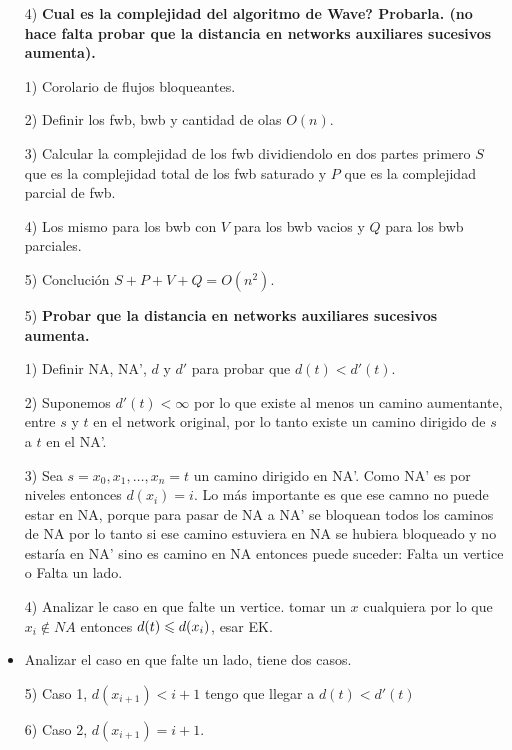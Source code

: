 \documentclass[12pt,a4paper]{article}
\begin{document}
\begin{itemize}
    \item [4)] \textbf{Cual es la complejidad del algoritmo de Wave? Probarla. (no hace falta 
    probar que la distancia en networks auxiliares sucesivos aumenta).}
    \label{dem:Wave}
\end{itemize}
\begin{itemize}
    \item [1)] Corolario de flujos bloqueantes.
    \item [2)] Definir los fwb, bwb y cantidad de olas $O(n)$.
    \item [3)] Calcular la complejidad de los fwb dividiendolo en dos partes
        primero $S$ que es la complejidad total de los fwb saturado y $P$ que 
        es la complejidad parcial de fwb.
    \item [4)] Los mismo para los bwb con $V$ para los bwb vacios y $Q$ para 
        los bwb parciales.
    \item [5)] Conclución $S + P + V + Q = O(n^{2})$.
\end{itemize}

\begin{itemize}
    \item [5)] \textbf{Probar que la distancia en networks auxiliares sucesivos aumenta.}
    \label{dem:dist2}
\end{itemize}
\begin{itemize}
    \item [1)] Definir NA, NA', $d$ y $d'$ para probar que $d(t) < d'(t)$.
    \item [2)] Suponemos $d'(t) < \infty$ por lo que existe al menos un camino 
        aumentante, entre $s$ y $t$ en el network original, por lo tanto existe 
        un camino dirigido de $s$ a $t$ en el NA'.
    \item [3)] Sea $s=x_{0},x_{1},\ldots ,x_{n} =t$ un camino dirigido en NA'. Como
        NA' es por niveles entonces $d(x_{i}) = i$. Lo más importante es que ese 
        camno no puede estar en NA, porque para pasar de NA a NA' se bloquean todos 
        los caminos de NA por lo tanto si ese camino estuviera en NA se hubiera 
        bloqueado y no estaría en NA' sino es camino en NA entonces puede suceder:
        Falta un vertice o Falta un lado.
    \item [4)] Analizar le caso en que falte un vertice. tomar un $x$ cualquiera por 
        lo que $x_{i} \notin NA$ entonces $d(t) \leqslant d(x_{i})$, esar EK.
    \item Analizar el caso en que falte un lado, tiene dos casos.
    \item [5)] Caso 1, $d(x_{i+1}) < i+1$ tengo que llegar a $d(t) < d'(t)$
    \item [6)] Caso 2, $d(x_{i+1}) = i+1$.
\end{itemize}
\end{document}

